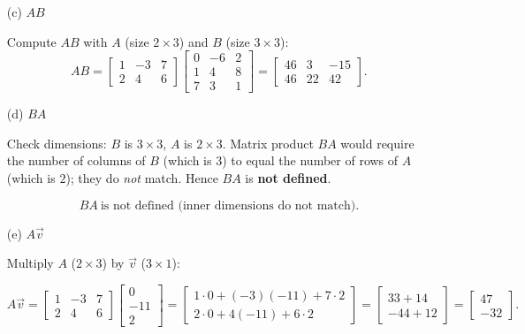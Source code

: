 \documentclass[a4paper,11pt,reqno]{amsart}
\numberwithin{equation}{section}
\begin{document}
\begin{center}
{{\begin{enumerate}
\bigskip

\item[(c)] \(\displaystyle AB\)

Compute \(AB\) with \(A\) (size \(2\times3\)) and \(B\) (size \(3\times3\)):
\[
AB=\begin{bmatrix}1 & -3 & 7\\[4pt]2 & 4 & 6\end{bmatrix}
\begin{bmatrix}0 & -6 & 2\\[4pt]1 & 4 & 8\\[4pt]7 & 3 & 1\end{bmatrix}
=
\begin{bmatrix}46 & 3 & -15\\[4pt]46 & 22 & 42\end{bmatrix}.
\]

\bigskip

\item[(d)] \(\displaystyle BA\)

Check dimensions: \(B\) is \(3\times3\), \(A\) is \(2\times3\). Matrix product \(BA\) would require the number of columns of \(B\) (which is \(3\)) to equal the number of rows of \(A\) (which is \(2\)); they do \emph{not} match. Hence \(BA\) is \textbf{not defined}.

\[
\boxed{\;BA\ \text{is not defined (inner dimensions do not match).}\;}
\]

\bigskip

\item[(e)] \(\displaystyle A\vec{v}\)

Multiply \(A\) (\(2\times3\)) by \(\vec{v}\) (\(3\times1\)):

\[
A\vec{v}=
\begin{bmatrix}1 & -3 & 7\\[4pt]2 & 4 & 6\end{bmatrix}
\begin{bmatrix}0\\[4pt]-11\\[4pt]2\end{bmatrix}
=
\begin{bmatrix}
1\cdot0 + (-3)(-11) + 7\cdot2\\[4pt]
2\cdot0 + 4(-11) + 6\cdot2
\end{bmatrix}
=
\begin{bmatrix}33+14\\-44+12\end{bmatrix}
=
\begin{bmatrix}47\\-32\end{bmatrix}.
\]

\end{enumerate}

}}
\end{center}
\end{document}

